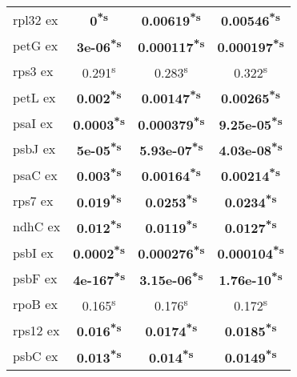 \documentclass[a4paper]{article}
\begin{document}
\begin{longtable}{l|c|c|c}
rpl32 ex&\textbf{0\textsuperscript{*}\textsuperscript{s}}&\textbf{0.00619\textsuperscript{*}\textsuperscript{s}}&\textbf{0.00546\textsuperscript{*}\textsuperscript{s}}\\
petG ex&\textbf{3e-06\textsuperscript{*}\textsuperscript{s}}&\textbf{0.000117\textsuperscript{*}\textsuperscript{s}}&\textbf{0.000197\textsuperscript{*}\textsuperscript{s}}\\
rps3 ex&0.291\textsuperscript{s}&0.283\textsuperscript{s}&0.322\textsuperscript{s}\\
petL ex&\textbf{0.002\textsuperscript{*}\textsuperscript{s}}&\textbf{0.00147\textsuperscript{*}\textsuperscript{s}}&\textbf{0.00265\textsuperscript{*}\textsuperscript{s}}\\
psaI ex&\textbf{0.0003\textsuperscript{*}\textsuperscript{s}}&\textbf{0.000379\textsuperscript{*}\textsuperscript{s}}&\textbf{9.25e-05\textsuperscript{*}\textsuperscript{s}}\\
psbJ ex&\textbf{5e-05\textsuperscript{*}\textsuperscript{s}}&\textbf{5.93e-07\textsuperscript{*}\textsuperscript{s}}&\textbf{4.03e-08\textsuperscript{*}\textsuperscript{s}}\\
psaC ex&\textbf{0.003\textsuperscript{*}\textsuperscript{s}}&\textbf{0.00164\textsuperscript{*}\textsuperscript{s}}&\textbf{0.00214\textsuperscript{*}\textsuperscript{s}}\\
rps7 ex&\textbf{0.019\textsuperscript{*}\textsuperscript{s}}&\textbf{0.0253\textsuperscript{*}\textsuperscript{s}}&\textbf{0.0234\textsuperscript{*}\textsuperscript{s}}\\
ndhC ex&\textbf{0.012\textsuperscript{*}\textsuperscript{s}}&\textbf{0.0119\textsuperscript{*}\textsuperscript{s}}&\textbf{0.0127\textsuperscript{*}\textsuperscript{s}}\\
psbI ex&\textbf{0.0002\textsuperscript{*}\textsuperscript{s}}&\textbf{0.000276\textsuperscript{*}\textsuperscript{s}}&\textbf{0.000104\textsuperscript{*}\textsuperscript{s}}\\
psbF ex&\textbf{4e-167\textsuperscript{*}\textsuperscript{s}}&\textbf{3.15e-06\textsuperscript{*}\textsuperscript{s}}&\textbf{1.76e-10\textsuperscript{*}\textsuperscript{s}}\\
rpoB ex&0.165\textsuperscript{s}&0.176\textsuperscript{s}&0.172\textsuperscript{s}\\
rps12 ex&\textbf{0.016\textsuperscript{*}\textsuperscript{s}}&\textbf{0.0174\textsuperscript{*}\textsuperscript{s}}&\textbf{0.0185\textsuperscript{*}\textsuperscript{s}}\\
psbC ex&\textbf{0.013\textsuperscript{*}\textsuperscript{s}}&\textbf{0.014\textsuperscript{*}\textsuperscript{s}}&\textbf{0.0149\textsuperscript{*}\textsuperscript{s}}\\

\end{longtable}
\end{document}
